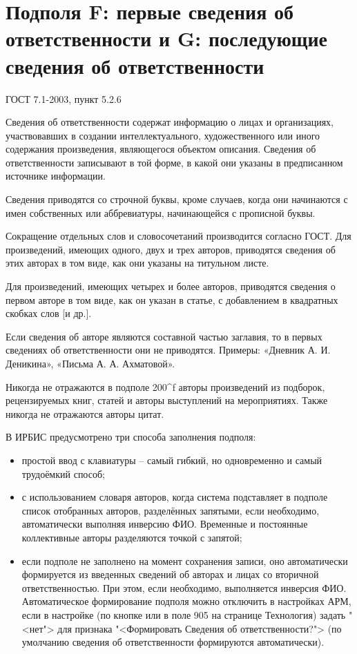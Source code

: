 \section{Подполя F: первые сведения об ответственности и G: последующие сведения об ответственности}

ГОСТ 7.1-2003, пункт 5.2.6

Сведения об ответственности содержат информацию о лицах и организациях, участвовавших в создании интеллектуального, художественного или иного содержания произведения, являющегося объектом описания. Сведения об ответственности записывают в той форме, в какой они указаны в предписанном источнике информации.

Сведения приводятся со строчной буквы, кроме случаев, когда они начинаются с имен собственных или аббревиатуры, начинающейся с прописной буквы.

Сокращение отдельных слов и словосочетаний производится согласно ГОСТ.
Для произведений, имеющих одного, двух и трех авторов, приводятся сведения об этих авторах в том виде, как они указаны на титульном листе.

Для произведений, имеющих четырех и более авторов, приводятся сведения о первом авторе в том виде, как он указан в статье, с добавлением в квадратных скобках слов [и др.].

Если сведения об авторе являются составной частью заглавия, то в первых сведениях об ответственности они не приводятся. Примеры: «Дневник А. И. Деникина», «Письма А. А. Ахматовой».

Никогда не отражаются в подполе 200\^{}f авторы произведений из подборок, рецензируемых книг, статей и авторы выступлений на мероприятиях. Также никогда не отражаются авторы цитат.

В ИРБИС предусмотрено три способа заполнения подполя:

\begin{itemize}
	\item простой ввод с клавиатуры -- самый гибкий, но одновременно и самый трудоёмкий способ;
	\item с использованием словаря авторов, когда система подставляет в подполе список отобранных авторов, разделённых запятыми, если необходимо, автоматически выполняя инверсию ФИО. Временные и постоянные коллективные авторы разделяются точкой с запятой;
	\item если подполе не заполнено на момент сохранения записи, оно автоматически формируется из введенных сведений об авторах и лицах со вторичной ответственностью. При этом, если необходимо, выполняется инверсия ФИО. Автоматическое формирование подполя можно отключить в настройках АРМ, если в настройке (по кнопке или в поле 905 на странице Технология) задать "<нет"> для признака "<Формировать Сведения об ответственности?"> (по умолчанию сведения об ответственности формируются автоматически).
\end{itemize}

